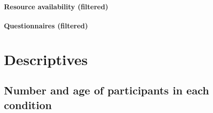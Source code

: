 \documentclass[
  bookmarksnumbered]{article}
\newenvironment{Shaded}{\begin{snugshade}}{\end{snugshade}}
\newcommand{\AttributeTok}[1]{\textcolor[rgb]{0.80,0.80,0.80}{#1}}
\newcommand{\FunctionTok}[1]{\textcolor[rgb]{0.94,0.94,0.56}{#1}}
\newcommand{\NormalTok}[1]{\textcolor[rgb]{0.80,0.80,0.80}{#1}}
\newcommand{\OtherTok}[1]{\textcolor[rgb]{0.94,0.94,0.56}{#1}}
\newcommand{\SpecialCharTok}[1]{\textcolor[rgb]{0.86,0.64,0.64}{#1}}
\newcommand{\StringTok}[1]{\textcolor[rgb]{0.80,0.58,0.58}{#1}}
\begin{document}
\paragraph{Resource availability (filtered)}\label{resource-availability-filtered}

\begin{Shaded}
\end{Shaded}

\paragraph{Questionnaires (filtered)}\label{questionnaires-filtered}

\begin{Shaded}
\end{Shaded}

\section{Descriptives}\label{descriptives}

\subsection{Number and age of participants in each condition}\label{number-and-age-of-participants-in-each-condition}
\end{document}
